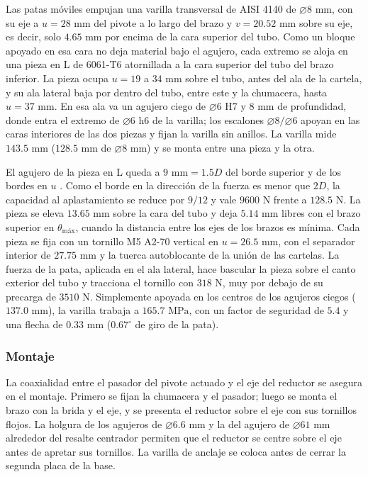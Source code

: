 \documentclass[../../General.tex]{subfiles}
\begin{document}
Las patas móviles empujan una varilla transversal de AISI 4140 de $\varnothing 8\text{ mm}$, con su eje a $u = 28\text{ mm}$ del pivote a lo largo del brazo y $v = 20.52\text{ mm}$ sobre su eje, es decir, solo $4.65\text{ mm}$ por encima de la cara superior del tubo. Como un bloque apoyado en esa cara no deja material bajo el agujero, cada extremo se aloja en una pieza en L de 6061-T6 atornillada a la cara superior del tubo del brazo inferior. La pieza ocupa $u = 19$ a $34\text{ mm}$ sobre el tubo, antes del ala de la cartela, y su ala lateral baja por dentro del tubo, entre este y la chumacera, hasta $u = 37\text{ mm}$. En esa ala va un agujero ciego de $\varnothing 6\text{ H7}$ y $8\text{ mm}$ de profundidad, donde entra el extremo de $\varnothing 6\text{ h6}$ de la varilla; los escalones $\varnothing 8/\varnothing 6$ apoyan en las caras interiores de las dos piezas y fijan la varilla sin anillos. La varilla mide $143.5\text{ mm}$ ($128.5\text{ mm}$ de $\varnothing 8\text{ mm}$) y se monta entre una pieza y la otra.

El agujero de la pieza en L queda a $9\text{ mm} = 1.5D$ del borde superior y de los bordes en $u$ \citep{aluminum2005manual}. Como el borde en la dirección de la fuerza es menor que $2D$, la capacidad al aplastamiento se reduce por $9/12$ y vale $9600\text{ N}$ frente a $128.5\text{ N}$. La pieza se eleva $13.65\text{ mm}$ sobre la cara del tubo y deja $5.14\text{ mm}$ libres con el brazo superior en $\theta_{\text{máx}}$, cuando la distancia entre los ejes de los brazos es mínima. Cada pieza se fija con un tornillo M5 A2-70 vertical en $u = 26.5\text{ mm}$, con el separador interior de $27.75\text{ mm}$ y la tuerca autoblocante de la unión de las cartelas. La fuerza de la pata, aplicada en el ala lateral, hace bascular la pieza sobre el canto exterior del tubo y tracciona el tornillo con $318\text{ N}$, muy por debajo de su precarga de $3510\text{ N}$. Simplemente apoyada en los centros de los agujeros ciegos ($137.0\text{ mm}$), la varilla trabaja a $165.7\text{ MPa}$, con un factor de seguridad de $5.4$ y una flecha de $0.33\text{ mm}$ ($0.67^\circ$ de giro de la pata).

\subsubsection{Montaje}\label{subsubsec:montaje_elev}

La coaxialidad entre el pasador del pivote actuado y el eje del reductor se asegura en el montaje. Primero se fijan la chumacera y el pasador; luego se monta el brazo con la brida y el eje, y se presenta el reductor sobre el eje con sus tornillos flojos. La holgura de los agujeros de $\varnothing 6.6\text{ mm}$ y la del agujero de $\varnothing 61\text{ mm}$ alrededor del resalte centrador permiten que el reductor se centre sobre el eje antes de apretar sus tornillos. La varilla de anclaje se coloca antes de cerrar la segunda placa de la base.
\end{document}
